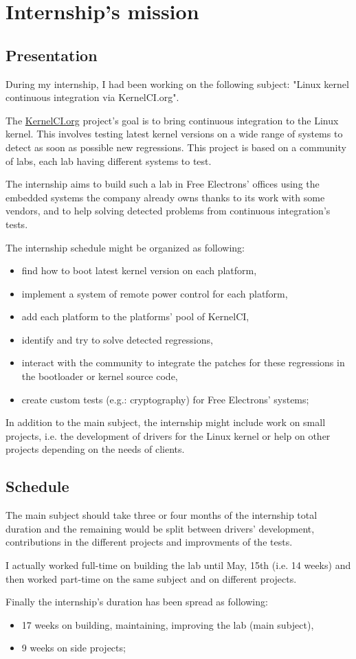 \chapter{Internship's mission}

\section{Presentation}
During my internship, I had been working on the following subject: "Linux kernel continuous integration via KernelCI.org".

The \href{https://kernelci.org}{KernelCI.org} project's goal is to bring continuous integration to the Linux kernel. This involves testing latest kernel versions on a wide range of systems to detect as soon as possible new regressions. This project is based on a community of labs, each lab having different systems to test.

The internship aims to build such a lab in Free Electrons' offices using the embedded systems the company already owns thanks to its work with some vendors, and to help solving detected problems from continuous integration's tests.

The internship schedule might be organized as following:
\begin{itemize}
  \item find how to boot latest kernel version on each platform,
  \item implement a system of remote power control for each platform,
  \item add each platform to the platforms' pool of KernelCI,
  \item identify and try to solve detected regressions,
  \item interact with the community to integrate the patches for these regressions in the bootloader or kernel source code,
  \item create custom tests (e.g.: cryptography) for Free Electrons' systems;
\end{itemize}

In addition to the main subject, the internship might include work on small projects, i.e. the development of drivers for the Linux kernel or help on other projects depending on the needs of clients.

\section{Schedule}
The main subject should take three or four months of the internship total duration and the remaining would be split between drivers' development, contributions in the different projects and improvments of the tests.

I actually worked full-time on building the lab until May, 15th (i.e. 14 weeks) and then worked part-time on the same subject and on different projects.

Finally the internship's duration has been spread as following:
\begin{itemize}
  \item 17 weeks on building, maintaining, improving the lab (main subject),
  \item 9 weeks on side projects;
\end{itemize}
